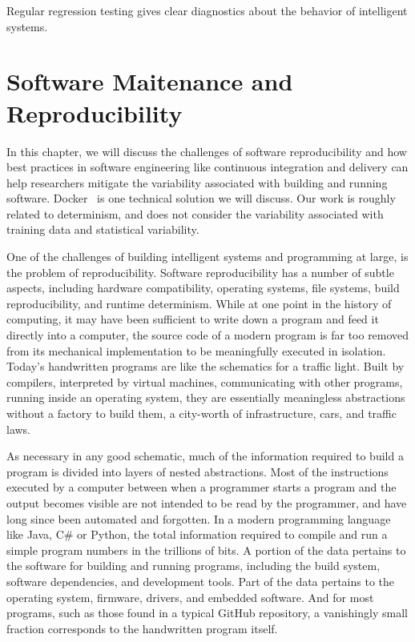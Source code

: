 \documentclass[12pt,initial,twoside,maitrise]{dms}
\numberwithin{equation}{section}
\numberwithin{table}{chapter}
\numberwithin{figure}{chapter}
\begin{document}
Regular regression testing gives clear diagnostics about the behavior of intelligent systems.

\chapter{Software Maitenance and Reproducibility}\label{ch:software-reproducibility}

In this chapter, we will discuss the challenges of software reproducibility and how best practices in software engineering like continuous integration and delivery can help researchers mitigate the variability associated with building and running software. Docker~\cite{merkel2014docker} is one technical solution we will discuss. Our work is roughly related to determinism, and does not consider the variability associated with training data and statistical variability.

One of the challenges of building intelligent systems and programming at large, is the problem of reproducibility. Software reproducibility has a number of subtle aspects, including hardware compatibility, operating systems, file systems, build reproducibility, and runtime determinism. While at one point in the history of computing, it may have been sufficient to write down a program and feed it directly into a computer, the source code of a modern program is far too removed from its mechanical implementation to be meaningfully executed in isolation. Today's handwritten programs are like the schematics for a traffic light. Built by compilers, interpreted by virtual machines, communicating with other programs, running inside an operating system, they are essentially meaningless abstractions without a factory to build them, a city-worth of infrastructure, cars, and traffic laws.

As necessary in any good schematic, much of the information required to build a program is divided into layers of nested abstractions. Most of the instructions executed by a computer between when a programmer starts a program and the output becomes visible are not intended to be read by the programmer, and have long since been automated and forgotten. In a modern programming language like Java, C\# or Python, the total information required to compile and run a simple program numbers in the trillions of bits. A portion of the data pertains to the software for building and running programs, including the build system, software dependencies, and development tools. Part of the data pertains to the operating system, firmware, drivers, and embedded software. And for most programs, such as those found in a typical GitHub repository, a vanishingly small fraction corresponds to the handwritten program itself.
\end{document}

